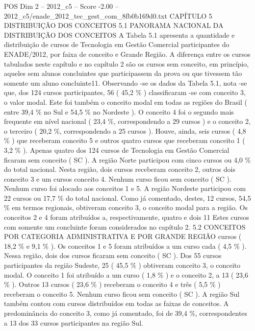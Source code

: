 \begin{textsample}{POS Dim 2 – 2012\_c5 – Score -2.00 – 2012\_c5/enade\_2012\_tec\_gest\_com\_8fb0b169d0.txt}  \label{ex:f2_pos_359}
CAPÍTULO 5 DISTRIBUIÇÃO DOS CONCEITOS 5.1 PANORAMA NACIONAL DA DISTRIBUIÇÃO DOS CONCEITOS A Tabela 5.1 apresenta a quantidade e distribuição de cursos de Tecnologia em Gestão Comercial participantes do ENADE/2012, por faixa de conceito e Grande Região.
A diferença entre os cursos tabulados neste capítulo e no capítulo 2 são os cursos sem conceito, em princípio, aqueles sem alunos concluintes que participassem da prova ou que tivessem tão somente um aluno concluinte11.
Observando -se os dados da Tabela 5.1, nota -se que, dos 124 cursos participantes, 56 ( 45,2 \% ) classificaram -se com conceito 3, o valor modal.
Este foi também o conceito modal em todas as regiões do Brasil ( entre 39,4 \% no Sul e 54,5 \% no Nordeste ).
O conceito 4 foi o segundo mais frequente em nível nacional ( 23,4 \%, correspondendo a 29 cursos ) e o conceito 2, o terceiro ( 20,2 \%, correspondendo a 25 cursos ).
Houve, ainda, seis cursos ( 4,8 \% ) que receberam conceito 5 e outros quatro cursos que receberam conceito 1 ( 3,2 \% ).
Apenas quatro dos 124 cursos de Tecnologia em Gestão Comercial ficaram sem conceito ( SC ).
A região Norte participou com cinco cursos ou 4,0 \% do total nacional.
Nesta região, dois cursos receberam conceito 2, outros dois conceito 3 e um cursos conceito 4.
Nenhum curso ficou sem conceito ( SC ).
Nenhum curso foi alocado aos conceitos 1 e 5.
A região Nordeste participou com 22 cursos ou 17,7 \% do total nacional.
Como já comentado, destes, 12 cursos, 54,5 \% em termos regionais, obtiveram conceito 3, o conceito modal para a região.
Os conceitos 2 e 4 foram atribuídos a, respectivamente, quatro e dois 11 Estes cursos com somente um concluinte foram considerados no capítulo 2. 5.2 CONCEITOS POR CATEGORIA ADMINISTRATIVA E POR GRANDE REGIÃO cursos ( 18,2 \% e 9,1 \% ).
Os conceitos 1 e 5 foram atribuídos a um curso cada ( 4,5 \% ).
Nessa região, dois dos cursos ficaram sem conceito ( SC ).
Dos 55 cursos participantes da região Sudeste, 25 ( 45,5 \% ) obtiveram conceito 3, o conceito modal.
O conceito 1 foi atribuído a um curso ( 1,8 \% ) e o conceito 2, a 13 ( 23,6 \% ).
Outros 13 cursos ( 23,6 \% ) receberam o conceito 4 e três ( 5,5 \% ) receberam o conceito 5.
Nenhum curso ficou sem conceito ( SC ).
A região Sul também contou com cursos distribuídos em todas as faixas de conceitos.
A predominância do conceito 3, como já comentado, foi de 39,4 \%, correspondentes a 13 dos 33 cursos participantes na região Sul.

\end{textsample}

